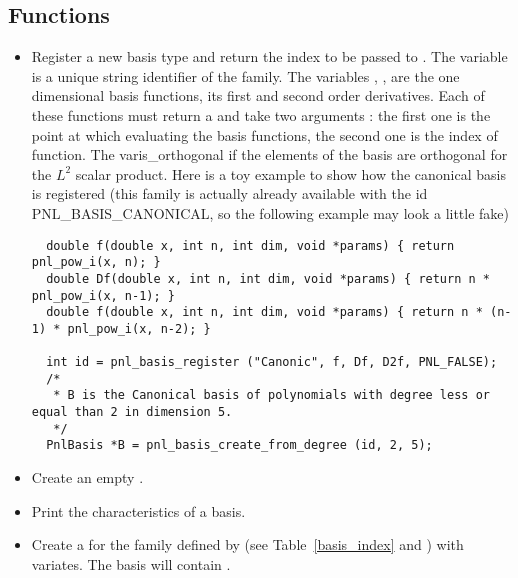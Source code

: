 \subsection{Functions}

\begin{itemize}
\item {}
\sshortdescribe Register a new basis type and return the index to be passed to
 . The variable  is a unique
string identifier of the family. The variables , ,  are
the one dimensional basis functions, its first and second order derivatives.
Each of these functions must return a  and take two arguments : the
first one is the point at which evaluating the basis functions, the second one
is the index of function. The var{is_orthogonal} if the elements of the basis are orthogonal for the $L^2$ scalar product. Here is a toy example to show how the canonical basis
is registered (this family is actually already available with the id
PNL_BASIS_CANONICAL, so the following example may look a little fake)
\begin{lstlisting}
  double f(double x, int n, int dim, void *params) { return pnl_pow_i(x, n); }
  double Df(double x, int n, int dim, void *params) { return n * pnl_pow_i(x, n-1); }
  double f(double x, int n, int dim, void *params) { return n * (n-1) * pnl_pow_i(x, n-2); }

  int id = pnl_basis_register ("Canonic", f, Df, D2f, PNL_FALSE);
  /*
   * B is the Canonical basis of polynomials with degree less or equal than 2 in dimension 5.
   */
  PnlBasis *B = pnl_basis_create_from_degree (id, 2, 5);
  \end{lstlisting}

\item {}
  \sshortdescribe Create an empty \PnlBasis.

\item {}
  \sshortdescribe Print the characteristics of a basis.

\item {}
  \sshortdescribe Create a \PnlBasis for the family
  defined by  (see Table~\ref{basis_index} and
  ) with 
  variates. The basis will contain .


\end{itemize}
